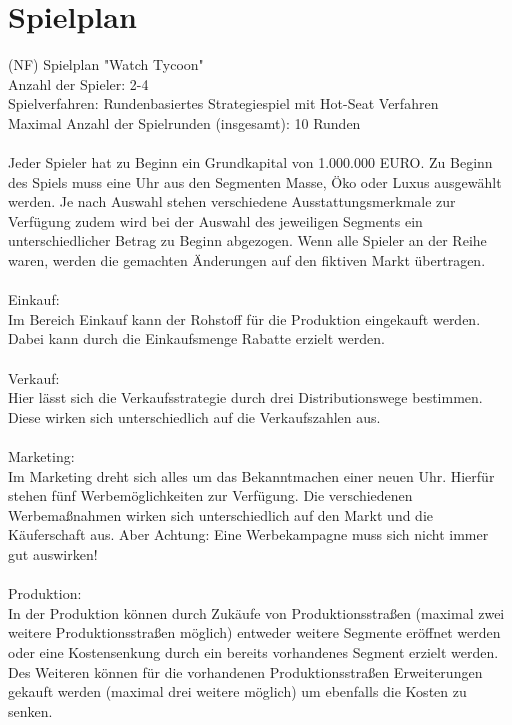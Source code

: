 \clearpage
\chapter{Spielplan}
(NF) Spielplan "Watch Tycoon" \\
Anzahl der Spieler: 2-4 \\
Spielverfahren: Rundenbasiertes Strategiespiel mit Hot-Seat Verfahren \\
Maximal Anzahl der Spielrunden (insgesamt): 10 Runden \\
\\
Jeder Spieler hat zu Beginn ein Grundkapital von 1.000.000 EURO. Zu Beginn des Spiels muss eine Uhr aus den Segmenten Masse, Öko oder Luxus ausgewählt werden. Je nach Auswahl stehen verschiedene Ausstattungsmerkmale zur Verfügung zudem wird bei der Auswahl des jeweiligen Segments ein unterschiedlicher Betrag zu Beginn abgezogen. Wenn alle Spieler an der Reihe waren, werden die gemachten Änderungen auf den fiktiven Markt übertragen. \\ 
\\
Einkauf:\\
Im Bereich Einkauf kann der Rohstoff für die Produktion eingekauft werden. Dabei kann durch die Einkaufsmenge Rabatte erzielt werden. \\
\\
Verkauf: \\
Hier lässt sich die Verkaufsstrategie durch drei Distributionswege bestimmen. Diese wirken sich unterschiedlich auf die Verkaufszahlen aus.\\
\\
Marketing:\\
Im Marketing dreht sich alles um das Bekanntmachen einer neuen Uhr. Hierfür stehen fünf Werbemöglichkeiten zur Verfügung. Die verschiedenen Werbemaßnahmen wirken sich unterschiedlich auf den Markt und die Käuferschaft aus. Aber Achtung: Eine Werbekampagne muss sich nicht immer gut auswirken!\\ 
\\
Produktion: \\
In der Produktion können durch Zukäufe von Produktionsstraßen (maximal zwei weitere Produktionsstraßen möglich) entweder weitere Segmente eröffnet werden oder eine Kostensenkung durch ein bereits vorhandenes Segment erzielt werden. Des Weiteren können für die vorhandenen Produktionsstraßen Erweiterungen gekauft werden (maximal drei weitere möglich) um ebenfalls die Kosten zu senken. \\ 
\\
